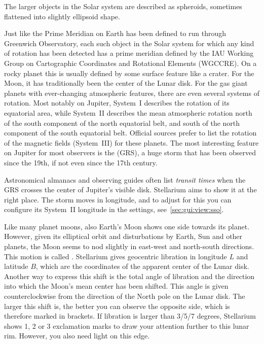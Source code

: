 The larger objects in the Solar system are described as spheroids,
sometimes flattened into slightly ellipsoid shape.

Just like the Prime Meridian on Earth has been defined to run through
Greenwich Observatory, each such object in the Solar system for which
any kind of rotation has been detected has a prime meridian defined by
the IAU Working Group on Cartographic Coordinates and Rotational
Elements (WGCCRE). On a rocky planet this is usually defined by some
surface feature like a crater. For the Moon, it has traditionally been
the center of the Lunar disk. For the gas giant planets with
ever-changing atmospheric features, there are even several systems of
rotation. Most notably on Jupiter, System~I describes the rotation of
its equatorial area, while System~II describes the mean atmospheric
rotation north of the south component of the north equatorial belt,
and south of the north component of the south equatorial
belt. Official sources prefer to list the rotation of the magnetic
fields (System~III) for these planets. The most interesting feature on
Jupiter for most observers is the  (GRS), a
huge storm that has been observed since the 19th, if not even since
the 17th century.

Astronomical almanacs and observing guides often list \emph{transit
  times} when the GRS crosses the center of Jupiter's visible
disk. Stellarium aims to show it at the right place. The storm moves
in longitude, and to adjust for this you can configure its System~II
longitude in the settings, see~\ref{sec:gui:view:sso}.

Like many planet moons, also Earth's Moon shows one side towards its
planet. However, given its elliptical orbit and disturbations by
Earth, Sun and other planets, the Moon seems to nod slightly in
east-west and north-south directions. This motion is called
.  Stellarium gives geocentric
libration in longitude $L$ and latitude $B$, which are the coordinates
of the apparent center of the Lunar disk. Another way to express this
shift is the total angle of libration and the direction into which the
Moon's mean center has been shifted. This angle is given
counterclockwise from the direction of the North pole on the Lunar
disk. The larger this shift is, the better you can observe the
opposite side, which is therefore marked in brackets. If libration is
larger than 3/5/7 degrees, Stellarium shows 1, 2 or 3 exclamation
marks to draw your attention further to this lunar rim. However, you
also need light on this edge.

